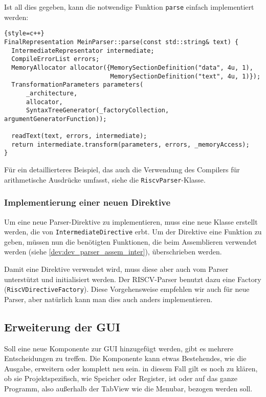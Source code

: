 Ist all dies gegeben, kann die notwendige Funktion \texttt{parse} einfach
implementiert werden:

\begin{lstlisting}{style=c++}
FinalRepresentation MeinParser::parse(const std::string& text) {
  IntermediateRepresentator intermediate;
  CompileErrorList errors;
  MemoryAllocator allocator({MemorySectionDefinition("data", 4u, 1),
                             MemorySectionDefinition("text", 4u, 1)});
  TransformationParameters parameters(
      _architecture,
      allocator,
      SyntaxTreeGenerator(_factoryCollection, argumentGeneratorFunction));

  readText(text, errors, intermediate);
  return intermediate.transform(parameters, errors, _memoryAccess);
}
\end{lstlisting}

Für ein detaillierteres Beispiel, das auch die Verwendung des Compilers für
arithmetische Ausdrücke umfasst, siehe die \texttt{RiscvParser}-Klasse.

\subsubsection{Implementierung einer neuen Direktive}

Um eine neue Parser-Direktive zu implementieren, muss eine neue Klasse erstellt
werden, die von \texttt{Intermediate\-Directive} erbt. Um der Direktive eine
Funktion zu geben, müssen nun die benötigten Funktionen, die beim Assemblieren
verwendet werden (siehe \autoref{dev:dev_parser_assem_inter}), überschrieben
werden.

Damit eine Direktive verwendet wird, muss diese aber auch vom Parser unterstützt
und initialisiert werden. Der RISCV-Parser benutzt dazu eine Factory
(\texttt{RiscV\-Directive\-Factory}). Diese Vorgehensweise empfehlen wir auch
für neue Parser, aber natürlich kann man dies auch anders implementieren.

\subsection{Erweiterung der GUI}
Soll eine neue Komponente zur GUI hinzugefügt werden, gibt es mehrere
Entscheidungen zu treffen. Die Komponente kann etwas Bestehendes, wie die
Ausgabe, erweitern oder komplett neu sein. in diesem Fall gilt es noch zu
klären, ob sie Projektspezifisch, wie Speicher oder Register, ist oder auf das
ganze Programm, also außerhalb der TabView wie die Menubar, bezogen werden soll.

